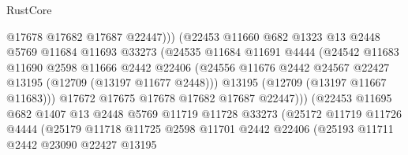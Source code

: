 \begin{lexlean}{RustCore}
\begin{coremodule}
                                  @17678
                                  @17682
                                  @17687
                                  @22447)))
                            (@22453
                              @11660
                              @682
                              @1323
                              @13
                              @2448
                              @5769
                              @11684
                              @11693
                              @33273
                              (@24535
                                @11684
                                @11691
                                @4444
                                (@24542
                                  @11683
                                  @11690
                                  @2598
                                  @11666
                                  @2442
                                  @22406
                                  (@24556
                                    @11676
                                    @2442
                                    @24567
                                    @22427
                                    @13195
                                    (@12709 (@13197 @11677 @2448)))
                                  @13195
                                  (@12709 (@13197 @11667 @11683)))
                                @17672
                                @17675
                                @17678
                                @17682
                                @17687
                                @22447)))
                          (@22453
                            @11695
                            @682
                            @1407
                            @13
                            @2448
                            @5769
                            @11719
                            @11728
                            @33273
                            (@25172
                              @11719
                              @11726
                              @4444
                              (@25179
                                @11718
                                @11725
                                @2598
                                @11701
                                @2442
                                @22406
                                (@25193
                                  @11711
                                  @2442
                                  @23090
                                  @22427
                                  @13195

\end{coremodule}
\end{lexlean}
